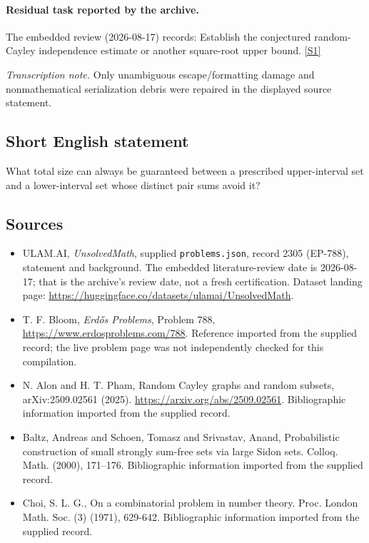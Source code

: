 \documentclass[11pt,a4paper]{article}
\newcommand{\sref}[2]{\hyperlink{source:#1:#2}{[S#2]}}
\begin{document}
\paragraph{Residual task reported by the archive.}

The embedded review (2026-08-17) records: Establish the conjectured random-Cayley independence estimate or another square-root upper bound. \sref{2305}{1}

{\small\emph{Transcription note.} Only unambiguous escape/formatting damage and nonmathematical serialization debris were repaired in the displayed source statement.}

\subsection{Short English statement}

What total size can always be guaranteed between a prescribed upper-interval set and a lower-interval set whose distinct pair sums avoid it?

\subsection{Sources}

{\small

\begin{itemize}

\item[\hypertarget{source:2305:1}{S1}] ULAM.AI, \emph{UnsolvedMath}, supplied \texttt{problems.json}, record 2305 (EP-788), statement and background. The embedded literature-review date is 2026-08-17; that is the archive’s review date, not a fresh certification. Dataset landing page: \url{https://huggingface.co/datasets/ulamai/UnsolvedMath}.

\item[\hypertarget{source:2305:2}{S2}] T. F. Bloom, \emph{Erdős Problems}, Problem 788, \url{https://www.erdosproblems.com/788}. Reference imported from the supplied record; the live problem page was not independently checked for this compilation.

\item[\hypertarget{source:2305:3}{S3}] N. Alon and H. T. Pham, Random Cayley graphs and random subsets, arXiv:2509.02561 (2025). \url{https://arxiv.org/abs/2509.02561}. Bibliographic information imported from the supplied record.

\item[\hypertarget{source:2305:4}{S4}] Baltz, Andreas and Schoen, Tomasz and Srivastav, Anand, Probabilistic construction of small strongly sum-free sets via large {S}idon sets. Colloq. Math. (2000), 171--176. Bibliographic information imported from the supplied record.

\item[\hypertarget{source:2305:5}{S5}] Choi, S. L. G., On a combinatorial problem in number theory. Proc. London Math. Soc. (3) (1971), 629-642. Bibliographic information imported from the supplied record.

\end{itemize}

}

\label{end:2305}
\end{document}
